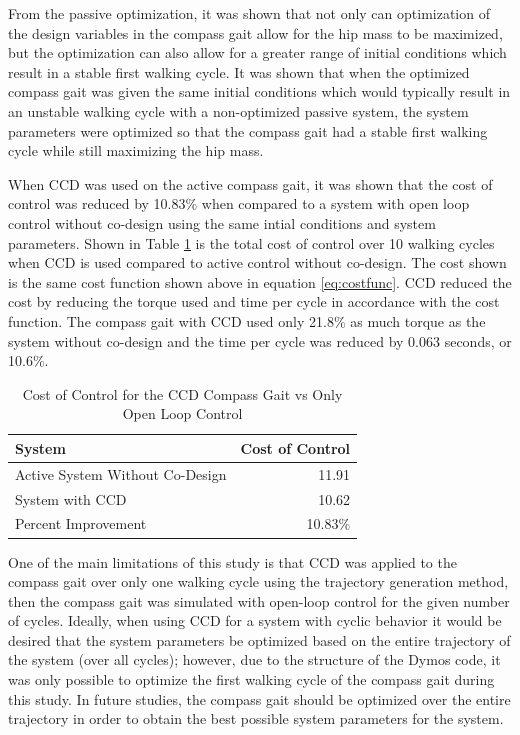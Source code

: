 \documentclass{./springer/svjour3}
\begin{document}
From the passive optimization, it was shown that not only can optimization 
of the design variables in the compass gait allow for the hip mass to be maximized, but the optimization can also allow for a greater range of initial conditions 
which result in a stable first walking cycle. It was shown that when the optimized compass gait was given the same initial conditions which would typically 
result in an unstable walking cycle with a non-optimized passive system, the system parameters were optimized so that the compass gait had a stable first walking cycle 
while still maximizing the hip mass.

When CCD was used on the active compass gait, it was shown that the cost of control was reduced by 10.83$\%$ when compared to a system 
with open loop control without co-design using the same intial conditions and system parameters. Shown in Table \ref{tab:costofcon} is the total cost of control over 10 
walking cycles when CCD is used compared to active control without co-design. The cost shown is the same cost function shown above in equation \ref{eq:costfunc}. CCD reduced the 
cost by reducing the torque used and time per cycle in accordance with the cost function. The compass gait with CCD used only 21.8$\%$ as much torque as the system without co-design 
and the time per cycle was reduced by 0.063 seconds, or 10.6$\%$.

\begin{table}[h]
\centering
\caption{Cost of Control for the CCD Compass Gait vs Only Open Loop Control}
\begin{tabular}{lr}
\toprule
System & Cost of Control \\
\midrule
Active System Without Co-Design & 11.91\\
System with CCD & 10.62\\
Percent Improvement & 10.83$\%$ \\
\end{tabular}
\label{tab:costofcon}
\end{table}

One of the main limitations of this study is that CCD was applied to the compass gait over only one walking cycle using the trajectory generation method,
then the compass gait was simulated with open-loop 
control for the given number of cycles.
Ideally, when using CCD for a system with cyclic behavior it would be desired that the system parameters be optimized based on the entire trajectory of the system 
(over all cycles); however, due to the structure of the Dymos code, it was only possible to optimize the first walking cycle of the compass gait during this study. 
In future studies, the compass gait should be optimized over the entire trajectory in order to obtain the best possible system parameters for the system.
\end{document}
